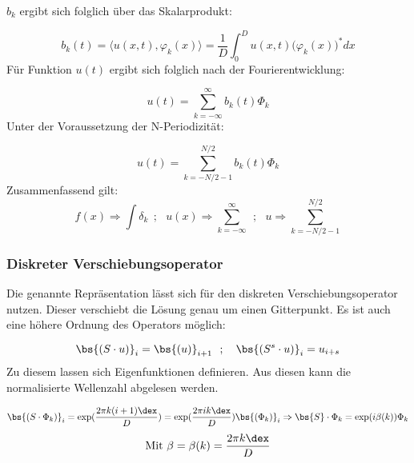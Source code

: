 $b_k$ ergibt sich folglich \"uber das Skalarprodukt:
\par
\begin{equation*}
	b_k(t) = \langle u(x,t), \varphi_k(x)\rangle = \frac{1}{D} \int_0^D u(x,t)\big(\varphi_k(x)\big)^* dx
\end{equation*}
F\"ur Funktion $u(t)$ ergibt sich folglich nach der Fourierentwicklung:
\par
\begin{equation*}
	u(t) = \sum_{k=-\infty}^\infty b_k(t) \Phi_k
\end{equation*}
Unter der Voraussetzung der N-Periodizit\"at:
\par
\begin{equation*}
	u(t) = \sum_{k=-N/2-1}^{N/2} b_k(t)\Phi_k
\end{equation*}
Zusammenfassend gilt:
\begin{equation*}
	f(x) \Rightarrow \int \delta_k~~;~~~u(x) \Rightarrow \sum_{k=-\infty}^\infty ~~;~~~ u\Rightarrow \sum_{k=-N/2-1}^{N/2}
\end{equation*}


\subsubsection{Diskreter Verschiebungsoperator}
Die genannte Repr\"asentation l\"asst sich f\"ur den diskreten Verschiebungsoperator nutzen. Dieser verschiebt die L\"osung genau um einen Gitterpunkt. Es ist auch eine h\"ohere Ordnung des Operators m\"oglich:
\par
\begin{equation*}
	\bs{(S\cdot u)}_i = \bs{(u)}_{i+1} ~~;~~~ \bs{(S^s\cdot u)}_i = u_{i+s}
\end{equation*}
Zu diesem lassen sich Eigenfunktionen definieren. Aus diesen kann die normalisierte Wellenzahl abgelesen werden.
\par
\begin{equation*}
	\bs{(S\cdot \Phi_k)}_i = \exp(\frac{2\pi k(i+1)\dex}{D}) = \exp(\frac{2\pi i k\dex}{D})\bs{(\Phi_k)}_i \Rightarrow \bs{S} \cdot \Phi_k = \exp(i\beta(k))\Phi_k
\end{equation*}
\begin{equation*}
	\textrm{Mit } \beta = \beta(k) =  \frac{2\pi k \dex}{D}
\end{equation*}

